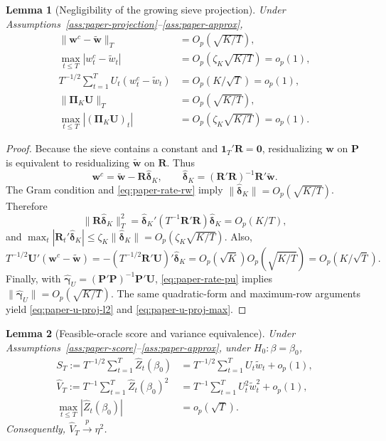 \documentclass[11pt]{article}
\newtheorem{lemma}{Lemma}
\begin{document}
\begin{lemma}[Negligibility of the growing sieve projection]
\label{lem:paper-projection}
Under Assumptions~\ref{ass:paper-projection}--\ref{ass:paper-approx},
\begin{align}
    \|\bm w^c-\widetilde{\bm w}\|_T&=O_p(\sqrt{K/T}),
       \label{eq:paper-weight-l2}\\
    \max_{t\leq T}|w_t^c-\widetilde w_t|&=O_p(\zeta_K\sqrt{K/T})=o_p(1),
       \label{eq:paper-weight-max}\\
    T^{-1/2}\sum_{t=1}^TU_t(w_t^c-\widetilde w_t)&=O_p(K/\sqrt T)=o_p(1),
       \label{eq:paper-weight-score}\\
    \|\bm\Pi_K\bm U\|_T&=O_p(\sqrt{K/T}),
       \label{eq:paper-u-proj-l2}\\
    \max_{t\leq T}|(\bm\Pi_K\bm U)_t|&=O_p(\zeta_K\sqrt{K/T})=o_p(1).
       \label{eq:paper-u-proj-max}
\end{align}
\end{lemma}

\begin{proof}
Because the sieve contains a constant and \(\bm1_T'\bm R=\bm0\), residualizing \(\bm w\) on \(\bm P\) is equivalent to residualizing \(\widetilde{\bm w}\) on \(\bm R\). Thus
\[
    \bm w^c=\widetilde{\bm w}-\bm R\widehat{\bm\delta}_K,
    \qquad
    \widehat{\bm\delta}_K=(\bm R'\bm R)^{-1}\bm R'\widetilde{\bm w}.
\]
The Gram condition and \eqref{eq:paper-rate-rw} imply \(\|\widehat{\bm\delta}_K\|=O_p(\sqrt{K/T})\). Therefore
\[
    \|\bm R\widehat{\bm\delta}_K\|_T^2
      =\widehat{\bm\delta}_K'(T^{-1}\bm R'\bm R)\widehat{\bm\delta}_K
      =O_p(K/T),
\]
and \(\max_t|\bm R_t'\widehat{\bm\delta}_K|\leq\zeta_K\|\widehat{\bm\delta}_K\|=O_p(\zeta_K\sqrt{K/T})\). Also,
\[
    T^{-1/2}\bm U'(\bm w^c-\widetilde{\bm w})
      =-(T^{-1/2}\bm R'\bm U)'\widehat{\bm\delta}_K
      =O_p(\sqrt K)O_p(\sqrt{K/T})=O_p(K/\sqrt T).
\]
Finally, with \(\widehat{\bm\gamma}_U=(\bm P'\bm P)^{-1}\bm P'\bm U\), \eqref{eq:paper-rate-pu} implies \(\|\widehat{\bm\gamma}_U\|=O_p(\sqrt{K/T})\). The same quadratic-form and maximum-row arguments yield \eqref{eq:paper-u-proj-l2} and \eqref{eq:paper-u-proj-max}.
\end{proof}

\begin{lemma}[Feasible-oracle score and variance equivalence]
\label{lem:paper-score}
Under Assumptions~\ref{ass:paper-score}--\ref{ass:paper-approx}, under \(H_0:\beta=\beta_0\),
\begin{align}
    S_T:=T^{-1/2}\sum_{t=1}^T\widehat Z_t(\beta_0)
      &=T^{-1/2}\sum_{t=1}^TU_t\widetilde w_t+o_p(1),
      \label{eq:paper-num-eq}\\
    \widehat V_T:=T^{-1}\sum_{t=1}^T\widehat Z_t(\beta_0)^2
      &=T^{-1}\sum_{t=1}^TU_t^2\widetilde w_t^2+o_p(1),
      \label{eq:paper-var-eq}\\
    \max_{t\leq T}|\widehat Z_t(\beta_0)|&=o_p(\sqrt T).
      \label{eq:paper-max-eq}
\end{align}
Consequently, \(\widehat V_T\xrightarrow{p}\eta^2\).
\end{lemma}
\end{document}
